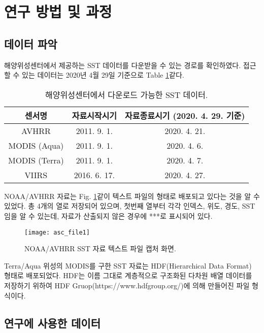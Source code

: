 \section{연구 방법 및 과정}

\subsection{데이터 파악}

해양위성센터에서 제공하는 SST 데이터를 다운받을 수 있는 경로를 확인하였다. 접근할 수 있는 데이터는 2020년 4월 29일 기준으로 Table \ref{table:KOSC-SST-data}\와 같다.


\begin{table}[!htbp]
	\caption{해양위성센터에서 다운로드 가능한 SST 데이터.}
	\begin{tabular}{c|c|c}
		\toprule
		센서명           & 자료시작시기       & 자료종료시기 (2020. 4. 29. 기준) \\ \toprule
		AVHRR         & 2011. 9. 1.  & 2020. 4. 21.          \\ \hline
		MODIS (Aqua)  & 2011. 9. 1.  & 2020. 4. 6.           \\ \hline
		MODIS (Terra) & 2011. 9. 1.  & 2020. 4. 7.           \\ \hline
		VIIRS         & 2016. 6. 17. & 2020. 4. 27.          \\ \bottomrule
	\end{tabular}

	\label{table:KOSC-SST-data}
\end{table}

NOAA/AVHRR 자료는 Fig. \ref{fig:asc_file}\와 같이 텍스트 파일의 형태로 배포되고 있다는 것을 알 수 있었다. 총 4개의 열로 저장되어 있으며, 첫번째 열부터 각각 인덱스, 위도, 경도, SST 임을 알 수 있는데, 자료가 산출되지 않은 경우에 ***로 표시되어 있다.

\begin{figure}[htbp]
	\centerline{\texttt{[image: asc\_file1]}}
	\caption{NOAA/AVHRR SST 자료 텍스트 파일 캡처 화면.}
	\label{fig:asc_file}
\end{figure}

Terra/Aqua 위성의 MODIS를 구한 SST 자료는 HDF(Hierarchical Data Format) 형태로 배포되었다. HDF는 이름 그대로 계층적으로 구조화된 다차원 배열 데이터를 저장하기 위하여 HDF Gruop(https://www.hdfgroup.org/)에 의해 만들어진 파일 형식이다.

\newpage
\subsection{연구에 사용한 데이터}

